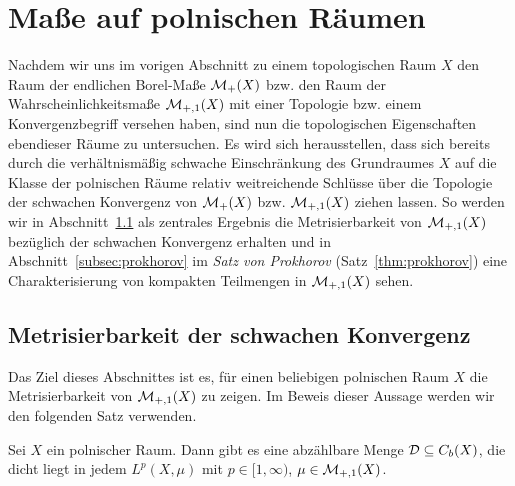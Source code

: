 \documentclass[../main/main.tex]{subfiles}
\begin{document}
	
	\section{Maße auf polnischen Räumen}
	
	Nachdem wir uns im vorigen Abschnitt zu einem topologischen Raum $X$ den Raum der endlichen Borel-Maße 
	$\mathcal{M}_{+}(X)$ bzw. den Raum der Wahrscheinlichkeitsmaße $\mathcal{M}_{+,1}(X)$ mit einer Topologie bzw.
	einem Konvergenzbegriff versehen haben, sind nun die topologischen Eigenschaften ebendieser Räume zu 
	untersuchen. Es wird sich herausstellen, dass sich bereits durch die verhältnismäßig schwache Einschränkung 
	des Grundraumes $X$ auf die Klasse der polnischen Räume relativ weitreichende Schlüsse über die Topologie 
	der schwachen Konvergenz von $\mathcal{M}_{+}(X)$ bzw. $\mathcal{M}_{+,1}(X)$ ziehen lassen. So werden wir in 
	Abschnitt~\ref{subsec:weakconvergencemetrizable} als zentrales Ergebnis die Metrisierbarkeit von 
	$\mathcal{M}_{+,1}(X)$ bezüglich der schwachen Konvergenz erhalten und in Abschnitt~\ref{subsec:prokhorov} im 
	\emph{Satz von Prokhorov} (Satz~\ref{thm:prokhorov}) eine Charakterisierung von kompakten Teilmengen 
	in $\mathcal{M}_{+,1}(X)$ sehen.
	
	\subsection{Metrisierbarkeit der schwachen Konvergenz}
	\label{subsec:weakconvergencemetrizable}
	
	Das Ziel dieses Abschnittes ist es, für einen beliebigen polnischen Raum $X$ die Metrisierbarkeit von 
	$\mathcal{M}_{+,1}(X)$ zu zeigen. Im Beweis dieser Aussage werden wir den folgenden Satz verwenden.
	
	\begin{Satz}
		\label{thm:Lp}
		Sei $X$ ein polnischer Raum. Dann gibt es eine abzählbare Menge 
		$\mathcal{D} \subseteq C_b(X)$, die dicht liegt in jedem 
		$L^p(X, \mu)$ mit $p \in [1, \infty)$, $\mu \in \mathcal{M}_{+,1}(X)$.
	\end{Satz}
	
\end{document}
